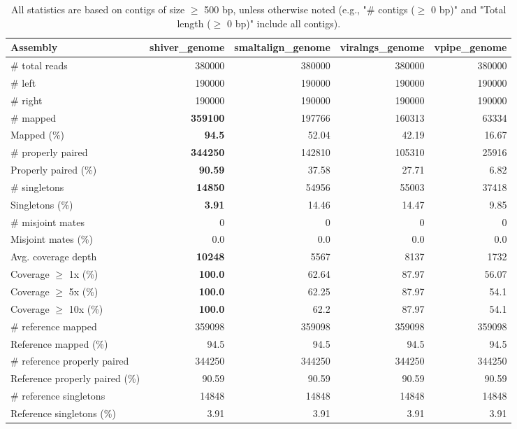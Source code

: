 \documentclass[12pt,a4paper]{article}
\begin{document}
\begin{table}[ht]
\begin{center}
\caption{All statistics are based on contigs of size $\geq$ 500 bp, unless otherwise noted (e.g., "\# contigs ($\geq$ 0 bp)" and "Total length ($\geq$ 0 bp)" include all contigs).}
\begin{tabular}{|l*{4}{|r}|}
\hline
Assembly & shiver\_genome & smaltalign\_genome & viralngs\_genome & vpipe\_genome \\ \hline
\# total reads & 380000 & 380000 & 380000 & 380000 \\ \hline
\# left & 190000 & 190000 & 190000 & 190000 \\ \hline
\# right & 190000 & 190000 & 190000 & 190000 \\ \hline
\# mapped & {\bf 359100} & 197766 & 160313 & 63334 \\ \hline
Mapped (\%) & {\bf 94.5} & 52.04 & 42.19 & 16.67 \\ \hline
\# properly paired & {\bf 344250} & 142810 & 105310 & 25916 \\ \hline
Properly paired (\%) & {\bf 90.59} & 37.58 & 27.71 & 6.82 \\ \hline
\# singletons & {\bf 14850} & 54956 & 55003 & 37418 \\ \hline
Singletons (\%) & {\bf 3.91} & 14.46 & 14.47 & 9.85 \\ \hline
\# misjoint mates & 0 & 0 & 0 & 0 \\ \hline
Misjoint mates (\%) & 0.0 & 0.0 & 0.0 & 0.0 \\ \hline
Avg. coverage depth & {\bf 10248} & 5567 & 8137 & 1732 \\ \hline
Coverage $\geq$ 1x (\%) & {\bf 100.0} & 62.64 & 87.97 & 56.07 \\ \hline
Coverage $\geq$ 5x (\%) & {\bf 100.0} & 62.25 & 87.97 & 54.1 \\ \hline
Coverage $\geq$ 10x (\%) & {\bf 100.0} & 62.2 & 87.97 & 54.1 \\ \hline
\# reference mapped & 359098 & 359098 & 359098 & 359098 \\ \hline
Reference mapped (\%) & 94.5 & 94.5 & 94.5 & 94.5 \\ \hline
\# reference properly paired & 344250 & 344250 & 344250 & 344250 \\ \hline
Reference properly paired (\%) & 90.59 & 90.59 & 90.59 & 90.59 \\ \hline
\# reference singletons & 14848 & 14848 & 14848 & 14848 \\ \hline
Reference singletons (\%) & 3.91 & 3.91 & 3.91 & 3.91 \\ \hline

\end{tabular}
\end{center}
\end{table}
\end{document}
